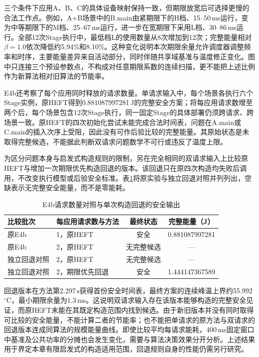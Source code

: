 

三个条件下应用A、B、C的具体设备映射保持一致，但期限放宽后可选择更慢的合法工作点。例如，A+B场景中的B.main由紧期限下的H档、15--50\,ms运行，变为中等期限下的M档、25--67\,ms运行，进一步在宽期限下采用L档、30--86\,ms运行。全部12次Stage执行中，最低档L的使用数量从8次增加到12次；完整能量相对$\beta=1.0$依次降低约5.94\%和8.10\%。这种变化说明本次期限余量允许调度器调整频率和时序，主要能量差异来自活动部分，同时伴随共享域基准与温度修正变化。图中只连接三个预设参数点，不构成对任意期限系数的连续扫描，更不能把上述比例作为新算法相对旧算法的节能率。

E4b还考察了每个应用同时释放的请求数量。单请求输入中，每个场景各执行六个Stage实例，原HEFT得到0.881087997281\,J的完整安全方案；将每应用请求数增至两个后，每个场景包含12次Stage执行，同一固定Stage的具体部署仍须跨请求、跨场景一致。原HEFT的四次初始化尝试未能完成合法时间表，问题在A.main或C.main的插入次序上受阻，因此没有可作后验比较的完整能量。其原始状态是未取得完整候选，不能据此判断双请求问题数学不可行或违反了温度上限。

为区分问题本身与启发式构造规则的限制，另在完全相同的双请求输入上比较原HEFT与增加一次期限优先构造回退的版本。该回退只在原四次构造均失败后调用，不改变执行模型或后验安全标准。表\ref{tab:exp-e4-requests}将原实验与独立回退对照并列列出，空缺表示无完整安全能量，而不是零能耗。

\begin{table}[htbp]
\centering
\small
\caption{E4b请求数量对照与单次构造回退的安全输出}
\label{tab:exp-e4-requests}
\begin{tabular}{llcc}
\toprule
比较批次 & 每应用请求数与方法 & 最终状态 & 完整能量（J） \\
\midrule
原E4b & 1，原HEFT & 安全 & 0.881087997281 \\
原E4b & 2，原HEFT & 无完整候选 & --- \\
独立回退对照 & 2，原HEFT & 无完整候选 & --- \\
独立回退对照 & 2，期限优先回退 & 安全 & 1.444147367589 \\
\bottomrule
\end{tabular}
\end{table}

回退版本在方法第2.297\,s获得首份安全时间表，最终方案的连续峰温上界约55.992\,$^\circ$C，最小期限余量为1.3\,ms。这说明双请求输入存在该版本能够构造的完整安全见证，而原HEFT未能在其既定构造范围内找到候选。由于新旧版本并没有同时取得可比较的安全能量，不能计算二者的节能率；也不能把单请求的原方法与双请求的回退版本连成同算法的规模能量曲线。即使比较平均每请求能耗，400\,ms固定窗口中基准及公共功率的分摊也会发生变化，需要与算法决策效果分开分析。上述结果用于界定本章有限启发式的构造适用范围，回退规则自身的性能仍需另行研究。

